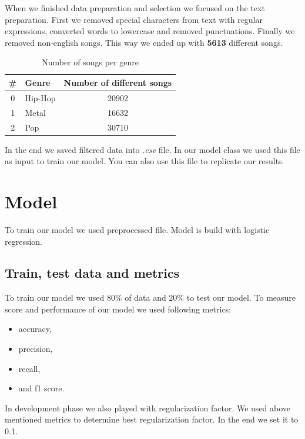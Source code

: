 \documentclass[a4paper,11pt]{article}
\begin{document}
When we finished data preparation and selection we focused on the text preparation. First we removed special characters from text with regular expressions, converted words to lowercase and removed punctuations. Finally we removed non-english songs. This way we ended up with \textbf{5613} different songs.

\begin{table}[h!]
\centering
\label{baseline}
\begin{tabular}{|clc|}
\hline
\# & Genre & Number of different songs \\
\hline
0 & Hip-Hop & 20902 \\
1 & Metal & 16632 \\
2 & Pop & 30710 \\
\hline
\end{tabular}
\caption{Number of songs per genre}
\end{table}

In the end we saved filtered data into \textit{.csv} file. In our model class we used this file as input to train our model. You can also use this file to replicate our results.

\section{Model}

To train our model we used preprocessed file. Model is build with logistic regression.

\subsection{Train, test data and metrics}
To train our model we used 80\% of data and 20\% to test our model. To measure score and performance of our model we used following metrics:
\begin{itemize}
\item accuracy,
\item precision,
\item recall,
\item and f1 score.
\end{itemize}

In development phase we also played with regularization factor. We used above mentioned metrics to determine best regularization factor. In the end we set it to 0.1.
\end{document}
